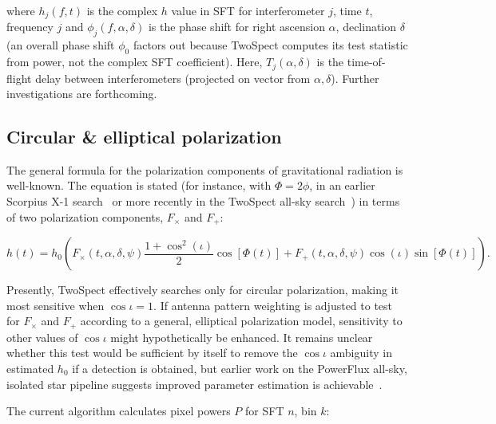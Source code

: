 \noindent where $h_{j}(f,t)$ is the complex $h$ value in SFT for interferometer $j$, time $t$, frequency $j$ and
$\phi_{j}(f,\alpha,\delta)$ is the phase shift for right ascension $\alpha$,
declination $\delta$ 
(an overall phase shift $\phi_{0}$ factors out because
TwoSpect computes its test statistic from power, not the complex SFT coefficient).
Here,
$T_{j}(\alpha,\delta)$ is the time-of-flight delay between interferometers 
(projected on vector from $\alpha,\delta$).
Further investigations are forthcoming.


\subsection{Circular \& elliptical polarization}
\label{circular_elliptical_polarization_TwoSpect}



The general formula for the polarization components of gravitational radiation is well-known.
The equation is stated (for instance, with $\Phi=2\phi$, in an earlier Scorpius X-1 search~\cite{AbbottScoX12007} or more recently in the TwoSpect all-sky search~\cite{GoetzTwoSpectResults2014}) in terms of two polarization components, $F_\times$ and $F_+$:

\begin{equation}
h(t)=h_{0} \left(F_{\times}(t,\alpha,\delta,\psi)\frac{1+\cos^{2}(\iota)}{2}\cos[\Phi(t)]+
F_{+}(t,\alpha,\delta,\psi)\cos(\iota)\sin[\Phi(t)]\right).
\label{TwoSpect_pol_effect}
\end{equation}

Presently, TwoSpect effectively searches only for circular polarization, making it most sensitive when $\cos \iota = 1$.
If antenna pattern weighting is adjusted to test for $F_\times$ and $F_+$ according to a general, elliptical polarization model, sensitivity to other values of $\cos \iota$ might hypothetically be enhanced.
It remains unclear whether this test would be sufficient by itself to remove the $\cos \iota$ ambiguity in estimated $h_0$ if a detection is obtained, but earlier work on the PowerFlux all-sky, isolated star pipeline suggests improved parameter estimation is achievable~\cite{DergachevRiles2005,MendellWette2008}.

The current algorithm calculates pixel powers $P$ for SFT $n$, bin $k$:

